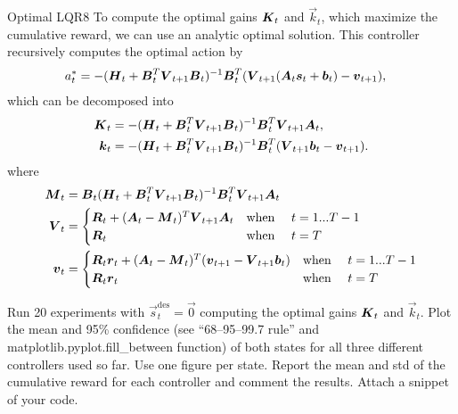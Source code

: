 \begin{questions}
	
	
\begin{question}{Optimal LQR}{8}
	To compute the optimal gains ${\boldsymbol{K}}_t$ and $\vec k_t$, which maximize the cumulative reward, we can use an analytic optimal solution. This controller recursively computes the optimal action by
	\begin{align}
		a_t^* &= -({\boldsymbol{H}}_t + {\boldsymbol{B}}^T_t {\boldsymbol{V}}_{t+1}{\boldsymbol{B}}_t)^{-1}	{\boldsymbol{B}}^T_t ({\boldsymbol{V}}_{t+1} ({\boldsymbol{A}}_t {\boldsymbol{s}}_t+{\boldsymbol{b}}_t )- {\boldsymbol{v}}_{t+1} ),
	\end{align}
	which can be decomposed into
	\begin{align}
		{\boldsymbol{K}}_t &= -({\boldsymbol{H}}_t + {\boldsymbol{B}}^T_t {\boldsymbol{V}}_{t+1}{\boldsymbol{B}}_t)^{-1}	{\boldsymbol{B}}^T_t {\boldsymbol{V}}_{t+1} {\boldsymbol{A}}_t,
		\\
		{\boldsymbol{k}}_t &= -({\boldsymbol{H}}_t + {\boldsymbol{B}}^T_t {\boldsymbol{V}}_{t+1}{\boldsymbol{B}}_t)^{-1}	{\boldsymbol{B}}^T_t ({\boldsymbol{V}}_{t+1} {\boldsymbol{b}}_t - {\boldsymbol{v}}_{t+1}).
	\end{align}
	where
	\begin{align}
		{\boldsymbol{M}}_t &= {\boldsymbol{B}}_t({\boldsymbol{H}}_t + {\boldsymbol{B}}^T_t {\boldsymbol{V}}_{t+1}{\boldsymbol{B}}_t)^{-1}	{\boldsymbol{B}}^T_t {\boldsymbol{V}}_{t+1} {\boldsymbol{A}}_t
		\\
		{\boldsymbol{V}}_t &=
		\begin{cases}
	       {\boldsymbol{R}}_t + ({\boldsymbol{A}}_t - {\boldsymbol{M}}_t)^T{\boldsymbol{V}}_{t+1}{\boldsymbol{A}}_t & \text{when \quad} t = 1...T-1
	       \\
	       {\boldsymbol{R}}_t & \text{when \quad} t = T
	    \end{cases}
	    \\
		{\boldsymbol{v}}_t &= 
		\begin{cases}
	       {\boldsymbol{R}}_t{\boldsymbol{r}}_t + ({\boldsymbol{A}}_t - {\boldsymbol{M}}_t)^T({\boldsymbol{v}}_{t+1} - {\boldsymbol{V}}_{t+1}{\boldsymbol{b}}_t) & \text{when \quad} t = 1...T-1
	       \\
	       {\boldsymbol{R}}_t{\boldsymbol{r}}_t & \text{when \quad} t = T
	    \end{cases}
	\end{align}		 

	Run 20 experiments with $\vec s^\text{des}_t = \vec 0$ computing the optimal gains ${\boldsymbol{K}}_t$ and $\vec k_t$. Plot the mean and 95\% confidence (see ``68--95--99.7 rule'' and matplotlib.pyplot.fill\_between function) of both states for all three different controllers used so far. Use one figure per state. 
	Report the mean and std of the cumulative reward for each controller and comment the results. Attach a snippet of your code.

\begin{answer}\end{answer}

\end{question}


\end{questions}
